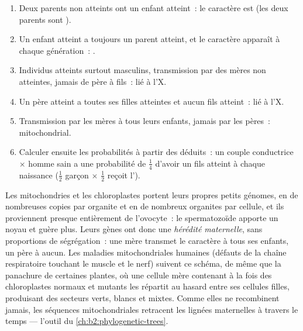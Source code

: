 \begin{method}\label{met:b2:meiosis-heredity:pedigree}
\begin{enumerate}
  \item Deux parents non atteints ont un enfant atteint~: le caractère
        est  (les deux parents sont ).
  \item Un enfant atteint a toujours un parent atteint, et le caractère
        apparaît à chaque génération~: .
  \item Individus atteints surtout masculins, transmission par des mères
        non atteintes, jamais de père à fils~:  lié à l'X.
  \item Un père atteint a toutes ses filles atteintes et aucun fils
        atteint~:  lié à l'X.
  \item Transmission par les mères à tous leurs enfants, jamais par les
        pères~: mitochondrial.
  \item Calculer ensuite les probabilités à partir des 
        déduits~: un couple conductrice $\times$ homme sain a une
        probabilité de $\tfrac14$ d'avoir un fils atteint à chaque
        naissance ($\tfrac12$ garçon $\times$ $\tfrac12$
        reçoit l').
\end{enumerate}
\end{method}

\begin{definition}\label{def:b2:meiosis-heredity:extranuclear}
Les mitochondries et les chloroplastes portent leurs propres petits
génomes, en de nombreuses copies par organite et en de nombreux
organites par cellule, et ils proviennent presque entièrement de
l'ovocyte~: le spermatozoïde apporte un noyau et guère plus. Leurs gènes
ont donc une \emph{hérédité maternelle}, sans proportions de
ségrégation~: une mère transmet le caractère à tous ses enfants, un
père à aucun. Les maladies mitochondriales humaines (défauts de la
chaîne respiratoire touchant le muscle et le nerf) suivent ce schéma,
de même que la panachure de certaines plantes, où une cellule mère
contenant à la fois des chloroplastes normaux et mutants les répartit
au hasard entre ses cellules filles, produisant des secteurs verts,
blancs et mixtes. Comme elles ne recombinent jamais, les séquences
mitochondriales retracent les lignées maternelles à travers le temps
--- l'outil du \cref{ch:b2:phylogenetic-trees}.
\end{definition}

